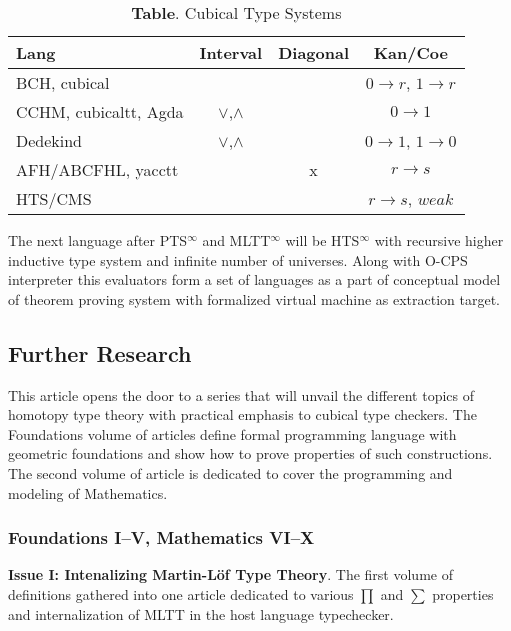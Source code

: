 \documentclass{article}
\theoremstyle{definition}
\begin{document}
\begin{table}[!ht]
  \centering
  \caption*{\textbf{Table}. Cubical Type Systems}
  \begin{adjustbox}{width=\columnwidth,center}
  \begin{tabular}{lccc}
    \hline
       Lang & Interval & Diagonal & Kan/Coe\\
    \hline
       BCH, cubical        & & & $0\rightarrow r$, $1 \rightarrow r$\\
       CCHM, cubicaltt, Agda       & $\lor$,$\land$ & & $0 \rightarrow 1$\\
       Dedekind          & $\lor$,$\land$ & & $0 \rightarrow 1$, $1 \rightarrow 0$\\
       AFH/ABCFHL, yacctt & & x & $r \rightarrow s$\\
       HTS/CMS    & &   & $r \rightarrow s$, $weak$\\
  \end{tabular}
  \end{adjustbox}
\end{table}

The next language after PTS$^{\infty}$ and MLTT$^{\infty}$ will
be HTS$^{\infty}$ with recursive higher inductive type system and infinite number of universes.
Along with O-CPS interpreter this evaluators form a set of languages as a part of conceptual model of theorem
proving system with formalized virtual machine as extraction target.

\subsection*{Further Research}

This article opens the door to a series that will unvail the different topics of
homotopy type theory with practical emphasis to cubical type checkers.
The Foundations volume of articles define formal programming language
with geometric foundations and show how to prove properties of such constructions.
The second volume of article is dedicated to cover the programming and modeling of Mathematics.

\subsubsection*{\hspace{0.5cm}Foundations I--V, Mathematics VI--X}

\hspace{0.4cm} {\bf Issue I: Intenalizing Martin-Löf Type Theory}.
The first volume of definitions gathered into one article dedicated to
various $\prod$ and $\sum$ properties and internalization of MLTT in the host language typechecker.
\end{document}
